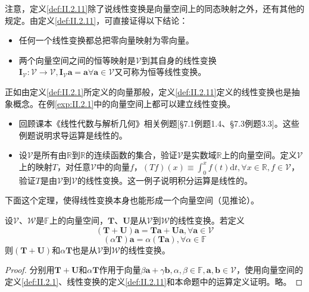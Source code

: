 \documentclass[main.tex]{subfiles}
\begin{document}
注意，定义\ref{def:II.2.11}除了说线性变换是向量空间上的同态映射之外，还有其他的规定。由定义\ref{def:II.2.11}，可直接证得以下结论：
\begin{itemize}
    \item 任何一个线性变换都总把零向量映射为零向量。
    \item 两个向量空间之间的恒等映射是$\mathcal{V}$到其自身的线性变换$\mathbf{I}_\mathcal{V}:\mathcal{V}\rightarrow\mathcal{V},\mathbf{I}_\mathcal{V}\mathbf{a}=\mathbf{a}\forall\mathbf{a}\in\mathcal{V}$又可称为恒等线性变换。
\end{itemize}

正如由定义\ref{def:II.2.1}所定义的向量那般，定义\ref{def:II.2.11}定义的线性变换也是抽象概念。在例\ref{exp:II.2.1}中的向量空间上都可以建立线性变换。

\begin{example}\label{exp:II.2.9}
    \begin{itemize}
        \item 回顾课本《线性代数与解析几何》相关例题\cite{周胜林2012线性代数}[\S 7.1例题1.4、\S 7.3例题3.3]。这些例题说明求导运算是线性的。
        \item 设$\mathcal{V}$是所有由$\mathbb{R}$到$\mathbb{R}$的连续函数的集合，验证$\mathcal{V}$是实数域$\mathbb{R}$上的向量空间。定义$\mathcal{V}$上的映射$T$，对任意$\mathcal{V}$中的向量$f$，$\left(Tf\right)\left(x\right)\equiv\int_0^x f\left(t\right)\mathrm{d}t,\forall x\in\mathbb{R},f\in\mathcal{V}$，验证$T$是由$\mathcal{V}$到$\mathcal{V}$的线性变换。这一例子说明积分运算是线性的。
    \end{itemize}
\end{example}


下面这个定理，使得线性变换本身也能形成一个向量空间（见推论）。

\begin{theorem}\label{thm:II.2.6}
    设$\mathcal{V}$、$\mathcal{W}$是$\mathbb{F}$上的向量空间，$\mathbf{T}$、$\mathbf{U}$是从$\mathcal{V}$到$\mathcal{W}$的线性变换。若定义
    \[\left(\mathbf{T}+\mathbf{U}\right)\mathbf{a}=\mathbf{Ta}+\mathbf{Ua},\forall\mathbf{a}\in\mathcal{V}\]
    \[\left(\alpha\mathbf{T}\right)\mathbf{a}=\alpha\left(\mathbf{Ta}\right),\forall\alpha\in\mathbb{F}\]
    则$\left(\mathbf{T}+\mathbf{U}\right)$和$\alpha\mathbf{T}$也是从$\mathcal{V}$到$\mathcal{W}$的线性变换。
\end{theorem}
\begin{proof}
    分别用$\mathbf{T}+\mathbf{U}$和$\alpha\mathbf{T}$作用于向量$\beta\mathbf{a}+\gamma\mathbf{b},\alpha,\beta\in\mathbb{F},\mathbf{a},\mathbf{b}\in\mathcal{V}$，使用向量空间的定义\ref{def:II.2.1}、线性变换的定义\ref{def:II.2.11}和本命题中的运算定义证明。略。
\end{proof}
\end{document}
